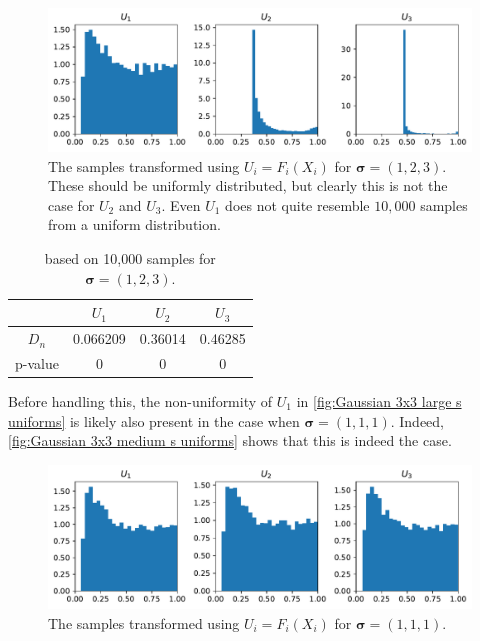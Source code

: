 \documentclass[../Thesis.tex]{subfiles}
\begin{document}
\begin{figure}[H]
    \centering
    \includegraphics[width=0.99\linewidth]{figures/ND examples/Gaussian 3x3 large s uniforms.pdf}
    \caption{The samples transformed using $U_i = F_i(X_i)$ for $\boldsymbol\sigma = (1,2,3)$. These should be uniformly distributed, but clearly this is not the case for $U_2$ and $U_3$. Even $U_1$ does not quite resemble $10{,}000$ samples from a uniform distribution.}
    \label{fig:Gaussian 3x3 large s uniforms}
\end{figure}
\begin{table}[h]
    \centering
    \begin{tabular}{c|c|c|c}
                & $U_1$    & $U_2$   & $U_3$   \\\hline
        $D_n$   & 0.066209 & 0.36014 & 0.46285 \\
        p-value & 0        & 0       & 0
    \end{tabular}
    \caption{based on 10,000 samples for $\boldsymbol\sigma = (1, 2, 3)$.}
\end{table}
Before handling this, the non-uniformity of $U_1$ in \autoref{fig:Gaussian 3x3 large s uniforms} is likely also present in the case when $\boldsymbol\sigma = (1,1,1)$. Indeed, \autoref{fig:Gaussian 3x3 medium s uniforms} shows that this is indeed the case.
\begin{figure}[H]
    \centering
    \includegraphics[width=0.99\linewidth]{figures/ND examples/Gaussian 3x3 medium s uniforms.pdf}
    \caption{The samples transformed using $U_i = F_i(X_i)$ for $\boldsymbol\sigma = (1,1,1)$.}
    \label{fig:Gaussian 3x3 medium s uniforms}
\end{figure}
\end{document}
